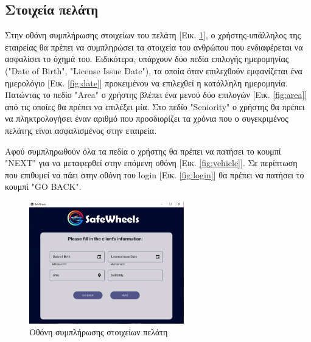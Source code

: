 \documentclass{llncs}
\begin{document}
\subsection{Στοιχεία πελάτη}
Στην οθόνη συμπλήρωσης στοιχείων του πελάτη [Εικ. \ref{fig:driver}], ο χρήστης-υπάλληλος της εταιρείας θα πρέπει να συμπληρώσει τα στοιχεία του ανθρώπου που ενδιαφέρεται 
να ασφαλίσει το όχημά του. Ειδικότερα, υπάρχουν δύο πεδία επιλογής ημερομηνίας ("Date of Birth", "License Issue Date"), τα οποία όταν επιλεχθούν εμφανίζεται 
ένα ημερολόγιο [Εικ. \ref{fig:date}] προκειμένου να επιλεχθεί η κατάλληλη ημερομηνία. Πατώντας το πεδίο "Area" ο χρήστης βλέπει ένα μενού δύο επιλογών [Εικ. \ref{fig:area}] από τις οποίες θα πρέπει να επιλέξει μία.
Στο πεδίο "Seniority" ο χρήστης θα πρέπει να πληκτρολογήσει έναν αριθμό που προσδιορίζει τα χρόνια που ο συγεκριμένος πελάτης είναι ασφαλισμένος στην εταιρεία. 

Αφού συμπληρωθούν όλα τα πεδία ο χρήστης θα πρέπει να πατήσει το 
κουμπί "NEXT" για να μεταφερθεί στην επόμενη οθόνη [Εικ. \ref{fig:vehicle}]. Σε περίπτωση που επιθυμεί να πάει στην οθόνη του login [Εικ. \ref{fig:login}] θα πρέπει να πατήσει το κουμπί "GO BACK".

\begin{figure}
    \begin{center}
        \includegraphics[width=0.6\textwidth]{images/driver.png}
    \end{center}
    \caption{Οθόνη συμπλήρωσης στοιχείων πελάτη}  
    \label{fig:driver}  
\end{figure}
\end{document}
